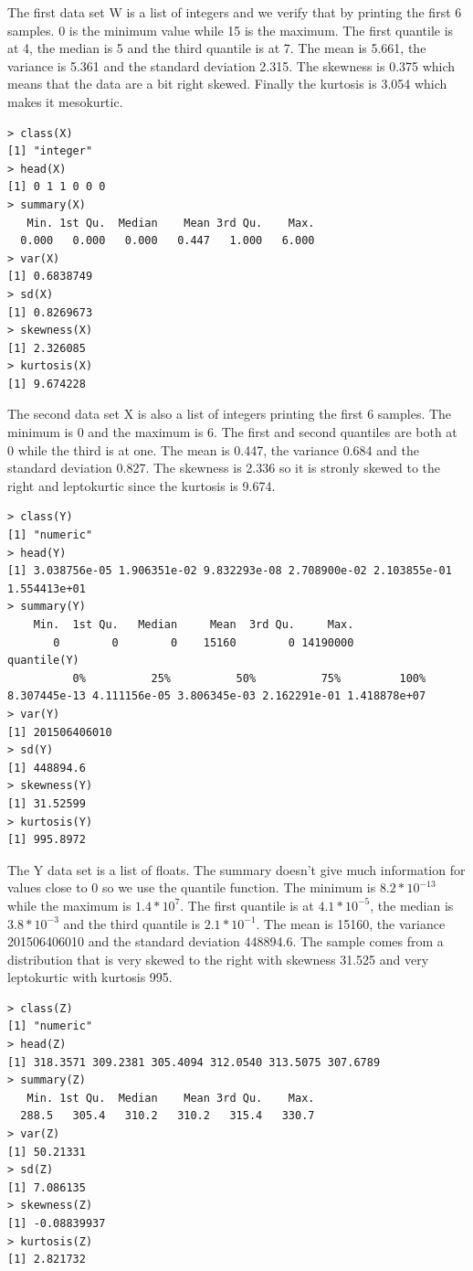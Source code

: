 \documentclass{article}
\begin{document}
\begin{enumerate}
  The first data set W is a list of integers and we verify that by printing the
  first 6 samples. 0 is the minimum value while 15 is the maximum. The first
  quantile is at 4, the median is 5 and the third quantile is at 7. The mean is
  5.661, the variance is 5.361 and the standard deviation 2.315. The skewness is
  0.375 which means that the data are a bit right skewed. Finally the kurtosis
  is 3.054 which makes it mesokurtic.
  
  \begin{lstlisting}
> class(X)
[1] "integer"
> head(X)
[1] 0 1 1 0 0 0
> summary(X)
   Min. 1st Qu.  Median    Mean 3rd Qu.    Max. 
  0.000   0.000   0.000   0.447   1.000   6.000 
> var(X)
[1] 0.6838749
> sd(X)
[1] 0.8269673
> skewness(X)
[1] 2.326085
> kurtosis(X)
[1] 9.674228
  \end{lstlisting}
  
  The second data set X is also a list of integers printing the first 6 samples.
  The minimum is 0 and the maximum is 6. The first and second quantiles are both
  at 0 while the third is at one. The mean is 0.447, the variance 0.684 and the
  standard deviation 0.827. The skewness is 2.336 so it is stronly skewed to the
  right and leptokurtic since the kurtosis is 9.674.
  
  \begin{lstlisting}
> class(Y)
[1] "numeric"
> head(Y)
[1] 3.038756e-05 1.906351e-02 9.832293e-08 2.708900e-02 2.103855e-01 1.554413e+01
> summary(Y)
    Min.  1st Qu.   Median     Mean  3rd Qu.     Max. 
       0        0        0    15160        0 14190000 
quantile(Y)
          0%          25%          50%          75%         100% 
8.307445e-13 4.111156e-05 3.806345e-03 2.162291e-01 1.418878e+07 
> var(Y)
[1] 201506406010
> sd(Y)
[1] 448894.6
> skewness(Y)
[1] 31.52599
> kurtosis(Y)
[1] 995.8972
  \end{lstlisting}
  
  The Y data set is a list of floats. The summary doesn't give much information
  for values close to 0 so we use the quantile function. The minimum is
  $8.2*10^{-13}$ while the maximum is $1.4*10^{7}$. The first quantile is at
  $4.1*10^{-5}$, the median is $3.8*10^{-3}$ and the third quantile is
  $2.1*10^{-1}$. The mean is 15160, the variance 201506406010 and the standard
  deviation 448894.6. The sample comes from a distribution that is very skewed
  to the right with skewness 31.525 and very leptokurtic with kurtosis 995.
  
  \begin{lstlisting}
> class(Z)
[1] "numeric"
> head(Z)
[1] 318.3571 309.2381 305.4094 312.0540 313.5075 307.6789
> summary(Z)
   Min. 1st Qu.  Median    Mean 3rd Qu.    Max. 
  288.5   305.4   310.2   310.2   315.4   330.7 
> var(Z)
[1] 50.21331
> sd(Z)
[1] 7.086135
> skewness(Z)
[1] -0.08839937
> kurtosis(Z)
[1] 2.821732
  \end{lstlisting}
  

\end{enumerate}
\end{document}
